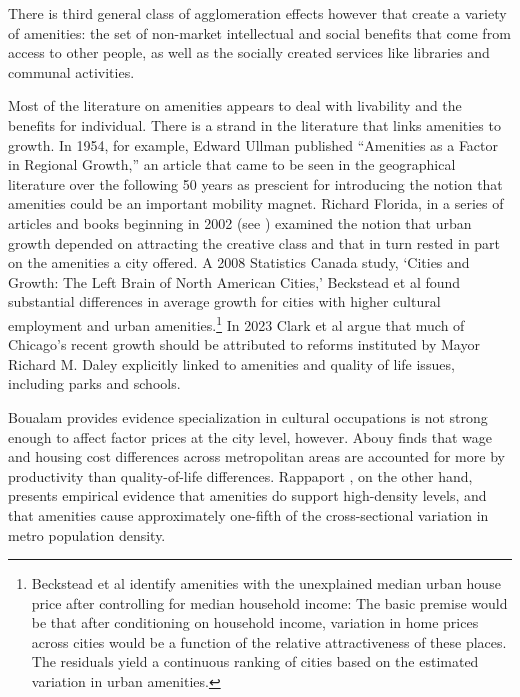 There is third general class of agglomeration effects however that  create a variety of amenities: the set of non-market intellectual and social benefits that come from access to other people, as well as the socially created services like libraries and communal activities.  

Most of the literature on amenities appears to deal with livability  and the benefits for individual. There is a strand in the literature that links amenities to  growth. In 1954, for example, Edward Ullman \cite{ullmanAmenitiesFactorRegional1954} published  ``Amenities as a Factor in Regional Growth,'' an article that came to be seen in the geographical literature over the following 50 years as prescient \cite{walcottCommentsEdwardUllman2010} for introducing  the notion that amenities could be an important mobility magnet. Richard Florida, in a series of articles and books beginning in 2002 (see \cite{floridaCreativeClassEconomic2014}) examined the notion that urban growth depended on attracting  the creative class and that in turn rested in part on the amenities a city offered. 
A 2008  Statistics Canada study, `Cities and Growth: The Left Brain of North American Cities,' Beckstead et al  \cite{becksteadCitiesGrowthLeft2008} found substantial differences in average growth for cities with higher cultural employment and urban amenities.\footnote{Beckstead et al identify amenities with the unexplained median urban house price after controlling for median household income:  The basic premise would be that after conditioning on household income, variation in home prices across cities would be a function of the relative attractiveness of these places. The residuals  yield a continuous ranking of cities based on the estimated variation in urban amenities.} 
In 2023 Clark et al \cite{clarkAmenitiesDriveUrban2002} argue that much of Chicago's recent growth  should be attributed to reforms instituted by Mayor Richard M.  Daley  explicitly linked to amenities and quality of life issues, including parks and schools.

  Boualam \cite{boualamDoesCultureAffect2014} provides evidence specialization in cultural occupations is not strong enough to affect factor prices at the city level, however. Abouy \cite{albouyWhatAreCities2016} finds that wage and housing cost differences across metropolitan areas are accounted for more by productivity than quality-of-life differences. Rappaport \cite{rappaportConsumptionAmenitiesCity2008}, on the other hand, presents empirical evidence  that amenities do support high-density levels, and that amenities  cause approximately one-fifth of the cross-sectional variation in metro population density. 

